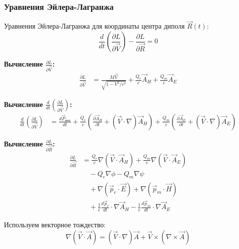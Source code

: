 \documentclass[a4paper,10pt]{article}
\newcommand{\modblock}[1]{\colorbox{modcolor!10}{\parbox{\dimexpr\linewidth-2\fboxsep}{#1}}}
\begin{document}
\modblock{

\subsubsection{Уравнения Эйлера-Лагранжа}

Уравнения Эйлера-Лагранжа для координаты центра диполя $\vec{R}(t)$:
\begin{equation}
\frac{d}{dt}\left(\frac{\partial L}{\partial \vec{V}}\right) - \frac{\partial L}{\partial \vec{R}} = 0
\label{eq:euler_lagrange}
\end{equation}

\textbf{Вычисление $\frac{\partial L}{\partial \vec{V}}$:}
\begin{align}
\frac{\partial L}{\partial \vec{V}} &= \frac{M\vec{V}}{\sqrt{1 - V^2/c^2}} + \frac{Q_e}{c}\vec{A}_H + \frac{Q_m}{c}\vec{A}_E
\label{eq:dL_dV}
\end{align}

\textbf{Вычисление $\frac{d}{dt}\left(\frac{\partial L}{\partial \vec{V}}\right)$:}
\begin{align}
\frac{d}{dt}\left(\frac{\partial L}{\partial \vec{V}}\right) &= \frac{d\vec{P}_{\text{мех}}}{dt} + \frac{Q_e}{c}\left(\frac{\partial\vec{A}_H}{\partial t} + (\vec{V}\cdot\nabla)\vec{A}_H\right) + \frac{Q_m}{c}\left(\frac{\partial\vec{A}_E}{\partial t} + (\vec{V}\cdot\nabla)\vec{A}_E\right)
\label{eq:d_dL_dV}
\end{align}

\textbf{Вычисление $\frac{\partial L}{\partial \vec{R}}$:}
\begin{align}
\frac{\partial L}{\partial \vec{R}} &= \frac{Q_e}{c}\nabla(\vec{V}\cdot\vec{A}_H) + \frac{Q_m}{c}\nabla(\vec{V}\cdot\vec{A}_E) \nonumber \\
&\quad - Q_e\nabla\phi - Q_m\nabla\psi \nonumber \\
&\quad + \nabla(\vec{p}_e\cdot\vec{E}) + \nabla(\vec{p}_m\cdot\vec{H}) \nonumber \\
&\quad + \frac{1}{c}\frac{d\vec{p}_e}{dt}\cdot\nabla\vec{A}_H - \frac{1}{c}\frac{d\vec{p}_m}{dt}\cdot\nabla\vec{A}_E
\label{eq:dL_dR}
\end{align}

Используем векторное тождество:
\begin{equation}
\nabla(\vec{V}\cdot\vec{A}) = (\vec{V}\cdot\nabla)\vec{A} + \vec{V}\times(\nabla\times\vec{A})
\label{eq:vector_identity}
\end{equation}

} %
\end{document}
